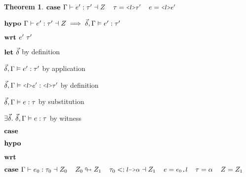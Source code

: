 \documentclass[acmsmall]{acmart}
\theoremstyle{definition}
\newtheorem{theorem}{Theorem}[section]
\begin{document}
\begin{theorem}
  \item \Z $\B{case } 
    \Gamma \entails e' \hastype \tau' \given Z
    \I
    \tau = \J{<$l$>$\tau'$}
    \I
    e = \J{<$l$>$e'$} 
  $ 
  \item \Z $\textbf{hypo } 
      \Gamma \vdash e' : \tau' \dashv Z  
      \implies
      \vec{\delta}, \Gamma \vDash e' : \tau'
  $ 
  \item \Z $\textbf{wrt } e' \ \tau'$ 
    \item \Z\Z $\textbf{let } \vec{\delta} $ by definition
    \item \Z\Z $
      \vec{\delta}, \Gamma \vDash e' : \tau'
    $ by application
    \item \Z\Z $
      \vec{\delta}, \Gamma \satisfies \J{<$l$>$e'$} \hastype \J{<$l$>$\tau'$}
    $ by definition
    \item \Z\Z $
      \vec{\delta}, \Gamma \vDash e : \tau 
    $ by substitution
    \item \Z\Z $
      \exists \vec{\delta} .\ \vec{\delta}, \Gamma \vDash e : \tau 
    $ by witness 

  \item \Z {} 
  \item \Z $\textbf{case } $ 
  \item \Z $\textbf{hypo } $ 
  \item \Z $\textbf{wrt } $ 



  \item \Z $\B{case } 
    \Gamma \entails e_0 \hastype \tau_0 \given Z_0
    \I
    Z_0 \looparrowright Z_1
    \I
    \tau_0 \subtypes \J{$l$->$\alpha$} \given Z_1
    \I
    e = \J{$e_0$.$l$} \I \tau = \alpha \I Z = Z_1
  $
   

\end{theorem}
\end{document}
